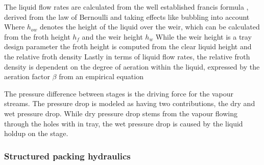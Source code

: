         The liquid flow rates are calculated from the well established francis formula ,
        derived from the law of Bernoulli and taking effects like bubbling into account
        Where $h_{ow}$ denotes the height of the liquid over the weir, which can be calculated from the
        froth height $h_f$ and the weir height $h_w$
        While the weir height is a tray design parameter the froth height is computed from the clear
        liquid height and the relative froth density
        Lastly in terms of liquid flow rates, the relative froth density is dependent on the
        degree of aeration within the liquid, expressed by the aeration factor $\beta$
        from an empirical equation

        The pressure difference between stages is the driving force for the vapour streams. The pressure drop
        is modeled as having two contributions, the dry and wet pressure drop. While dry pressure drop
        stems from the vapour flowing through the holes with in tray, the wet pressure drop is caused by the liquid
        holdup on the stage.

        \subsubsection{Structured packing hydraulics}
        \label{sec:mathpro:dynamic:strpackhyd}

